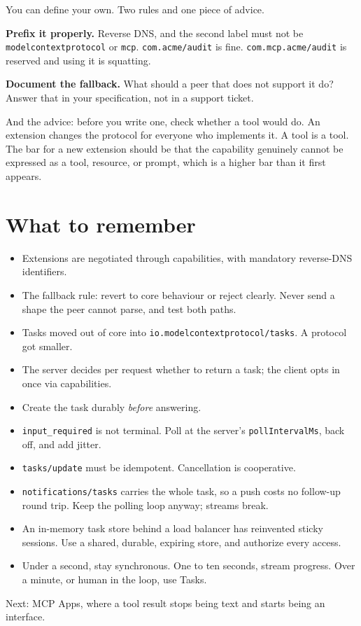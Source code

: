 You can define your own. Two rules and one piece of advice.

\textbf{Prefix it properly.} Reverse DNS, and the second label must not be
\texttt{modelcontextprotocol} or \texttt{mcp}. \texttt{com.acme/audit} is fine.
\texttt{com.mcp.acme/audit} is reserved and using it is squatting.

\textbf{Document the fallback.} What should a peer that does not support it do?
Answer that in your specification, not in a support ticket.

And the advice: before you write one, check whether a tool would do. An
extension changes the protocol for everyone who implements it. A tool is a tool.
The bar for a new extension should be that the capability genuinely cannot be
expressed as a tool, resource, or prompt, which is a higher bar than it first
appears.

\section{What to remember}

\begin{itemize}[leftmargin=1.6em, itemsep=3pt]
\item Extensions are negotiated through capabilities, with mandatory reverse-DNS
identifiers.
\item The fallback rule: revert to core behaviour or reject clearly. Never send
a shape the peer cannot parse, and test both paths.
\item Tasks moved out of core into \texttt{io.modelcontextprotocol/tasks}. A
protocol got smaller.
\item The server decides per request whether to return a task; the client opts
in once via capabilities.
\item Create the task durably \emph{before} answering.
\item \texttt{input\_required} is not terminal. Poll at the server's
\texttt{pollIntervalMs}, back off, and add jitter.
\item \texttt{tasks/update} must be idempotent. Cancellation is cooperative.
\item \texttt{notifications/tasks} carries the whole task, so a push costs no
follow-up round trip. Keep the polling loop anyway; streams break.
\item An in-memory task store behind a load balancer has reinvented sticky
sessions. Use a shared, durable, expiring store, and authorize every access.
\item Under a second, stay synchronous. One to ten seconds, stream progress.
Over a minute, or human in the loop, use Tasks.
\end{itemize}

Next: MCP Apps, where a tool result stops being text and starts being an
interface.
